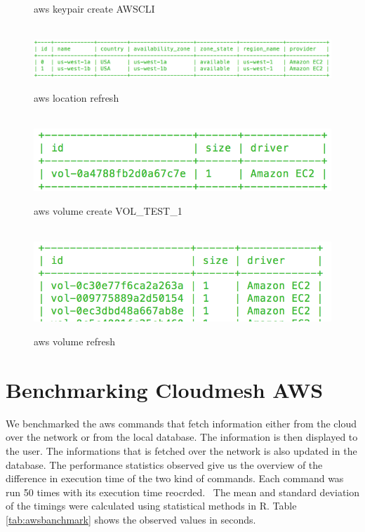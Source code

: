 \documentclass[9pt,twocolumn,twoside]{../../styles/osajnl}
\begin{document}
\begin{figure}[htb]
  \vspace{-1.5\baselineskip}
  \caption{aws keypair create AWSCLI}
  \label{fig:keypaircreate}
~\newline
  \centering
  \includegraphics[width=\linewidth]{images/cms_aws_location_list.png}
  \vspace{-1.5\baselineskip}
  \caption{aws location refresh}
  \label{fig:locationlist}
~\newline
  \centering
  \includegraphics[width=0.5\linewidth]{images/cms_aws_volume_create_VOL_TEST_1.png}
  \vspace{-0.5\baselineskip}
  \caption{aws volume create VOL\_TEST\_1}
  \label{fig:createvolume}
~\newline
  \centering
  \includegraphics[width=0.5\linewidth]{images/cms_aws_volume_list.png}
  \caption{aws volume refresh}
  \label{fig:volumelist}
\end{figure}
    
\section{Benchmarking Cloudmesh AWS}

We benchmarked the aws commands that fetch information either from the cloud over the network or from the local database. The information is then displayed to the user. The informations that is fetched over the network is also updated in the database. The performance statistics observed give us the overview of the difference in execution time of the two kind of commands. Each command was run 50 times with its execution time reocrded.  The mean and standard deviation of the timings were calculated using statistical methods in R. Table \ref{tab:awsbanchmark}  shows the observed values in seconds.
\end{document}
